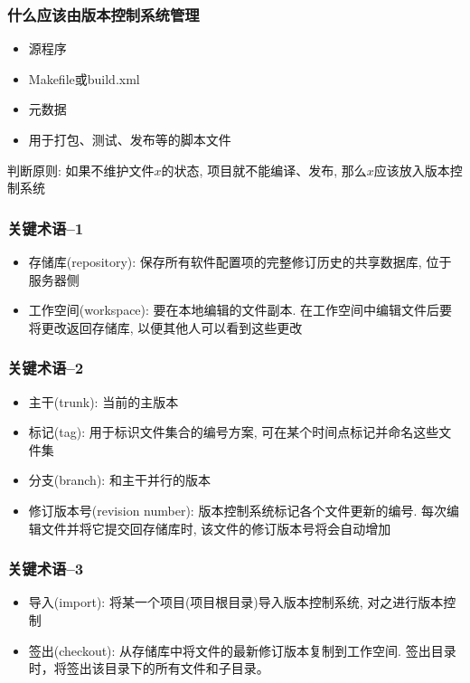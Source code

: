 \documentclass[compress]{beamer}
\begin{document}
\begin{frame}
  \frametitle{什么应该由版本控制系统管理}
  \begin{itemize}
	\item 源程序
	\item Makefile或build.xml
	\item 元数据
	\item 用于打包、测试、发布等的脚本文件
  \end{itemize}
  判断原则: 如果不维护文件$x$的状态, 项目就不能编译、发布, 
  那么$x$应该放入版本控制系统
  
\end{frame}

\begin{frame}
\frametitle{关键术语--1}
\begin{itemize}
\item 存储库(repository): 保存所有软件配置项的完整修订历史的共享数据库, 
  位于服务器侧
\item 工作空间(workspace): 要在本地编辑的文件副本. 
  在工作空间中编辑文件后要将更改返回存储库, 以便其他人可以看到这些更改
  \end{itemize}

  
\end{frame}


\begin{frame}
\frametitle{关键术语--2}
\begin{itemize}
  \item 主干(trunk): 当前的主版本
  \item 标记(tag): 用于标识文件集合的编号方案, 可在某个时间点标记并命名这些文件集
  \item 分支(branch): 和主干并行的版本
  \item 修订版本号(revision number): 版本控制系统标记各个文件更新的编号. 
  每次编辑文件并将它提交回存储库时, 该文件的修订版本号将会自动增加
\end{itemize}


\end{frame}

\begin{frame}
\frametitle{关键术语--3}
\begin{itemize}
\item 导入(import): 将某一个项目(项目根目录)导入版本控制系统, 
  对之进行版本控制
\item 签出(checkout): 从存储库中将文件的最新修订版本复制到工作空间. 
  签出目录时，将签出该目录下的所有文件和子目录。
\end{itemize}

\end{frame}
\end{document}
